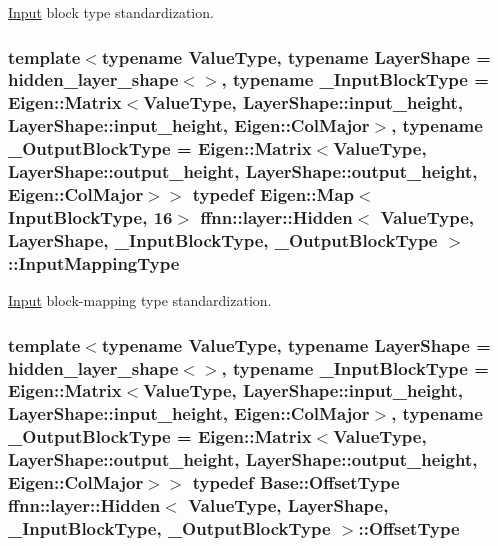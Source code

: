 \hyperlink{classffnn_1_1layer_1_1_input}{Input} block type standardization. 

\hypertarget{classffnn_1_1layer_1_1_hidden_a9297d5b8ac45dc288ee1b91f15bb4047}{
\subsubsection[{Input\-Mapping\-Type}]{\setlength{\rightskip}{0pt plus 5cm}template$<$typename Value\-Type, typename Layer\-Shape = hidden\-\_\-layer\-\_\-shape$<$$>$, typename \-\_\-\-Input\-Block\-Type = Eigen\-::\-Matrix$<$\-Value\-Type, Layer\-Shape\-::input\-\_\-height, Layer\-Shape\-::input\-\_\-height, Eigen\-::\-Col\-Major$>$, typename \-\_\-\-Output\-Block\-Type = Eigen\-::\-Matrix$<$\-Value\-Type, Layer\-Shape\-::output\-\_\-height, Layer\-Shape\-::output\-\_\-height, Eigen\-::\-Col\-Major$>$$>$ typedef Eigen\-::\-Map$<${\bf Input\-Block\-Type}, 16$>$ {\bf ffnn\-::layer\-::\-Hidden}$<$ Value\-Type, Layer\-Shape, \-\_\-\-Input\-Block\-Type, \-\_\-\-Output\-Block\-Type $>$\-::{\bf Input\-Mapping\-Type}}}\label{classffnn_1_1layer_1_1_hidden_a9297d5b8ac45dc288ee1b91f15bb4047}


\hyperlink{classffnn_1_1layer_1_1_input}{Input} block-\/mapping type standardization. 

\hypertarget{classffnn_1_1layer_1_1_hidden_ae2409b970adafb0ebc9b2eec62c4aac4}{
\subsubsection[{Offset\-Type}]{\setlength{\rightskip}{0pt plus 5cm}template$<$typename Value\-Type, typename Layer\-Shape = hidden\-\_\-layer\-\_\-shape$<$$>$, typename \-\_\-\-Input\-Block\-Type = Eigen\-::\-Matrix$<$\-Value\-Type, Layer\-Shape\-::input\-\_\-height, Layer\-Shape\-::input\-\_\-height, Eigen\-::\-Col\-Major$>$, typename \-\_\-\-Output\-Block\-Type = Eigen\-::\-Matrix$<$\-Value\-Type, Layer\-Shape\-::output\-\_\-height, Layer\-Shape\-::output\-\_\-height, Eigen\-::\-Col\-Major$>$$>$ typedef {\bf Base\-::\-Offset\-Type} {\bf ffnn\-::layer\-::\-Hidden}$<$ Value\-Type, Layer\-Shape, \-\_\-\-Input\-Block\-Type, \-\_\-\-Output\-Block\-Type $>$\-::{\bf Offset\-Type}}}\label{classffnn_1_1layer_1_1_hidden_ae2409b970adafb0ebc9b2eec62c4aac4}


